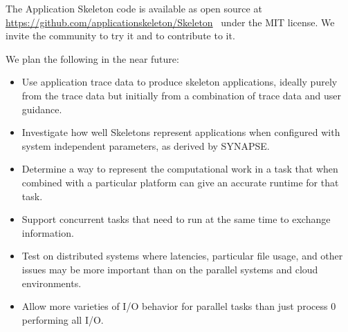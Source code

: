 \documentclass[preprint,12pt]{elsarticle}
\newcommand{\katznote}[1]{ {\textcolor{blue}    { ***Dan:   #1 }}}
\newcommand{\zhaonote}[1]{{\textcolor{cyan}{ ***Zhao:  #1 }}}
\newcommand{\katznote}[1]{}
\newcommand{\zhaonote}[1]{}
\begin{document}
The Application Skeleton code is available as open source at \url{https://github.com/applicationskeleton/Skeleton}~\cite{skeleton-software-v1.2} under the MIT license. We invite the community to try it and to contribute to it.

We plan the following in the near future:
\begin{itemize}
\item {} Use application trace data to produce skeleton applications, ideally purely from the trace data but initially from a combination of trace data and user guidance.
\item {} Investigate how well Skeletons represent applications when
    configured with system independent parameters, as derived by SYNAPSE.
\item {} Determine a way to represent the computational work in a task that when combined with a particular platform can give an accurate runtime for that task.
\item {} Support concurrent tasks that need to run at the same time to exchange information.
\item {} Test on distributed systems where latencies, particular file usage, and other issues may be more important than on the parallel systems and cloud environments.
\item {} Allow more varieties of I/O behavior for parallel tasks than just process 0 performing all I/O.
\end{itemize}
\end{document}
